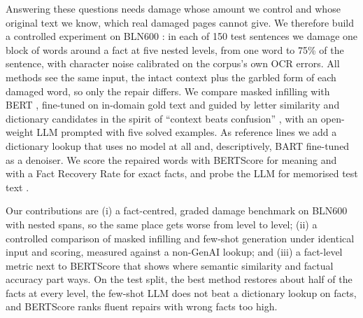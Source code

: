 Answering these questions needs damage whose amount we control and whose original text we know, which real damaged
pages cannot give. We therefore build a controlled experiment on BLN600 \citep{booth-etal-2024-bln600}: in each of
150 test sentences we damage one block of words around a fact at five nested levels, from one word to 75\% of the
sentence, with character noise calibrated on the corpus's own OCR errors. All methods see the same input, the
intact context plus the garbled form of each damaged word, so only the repair differs. We compare masked infilling
with BERT \citep{devlin2019bert}, fine-tuned on in-domain gold text and guided by letter similarity and dictionary
candidates in the spirit of ``context beats confusion'' \citep{evershed2014correcting}, with an open-weight LLM
prompted with five solved examples. As reference lines we add a dictionary lookup that uses no model at all and,
descriptively, BART \citep{lewis2020bart} fine-tuned as a denoiser. We score the repaired words with BERTScore \citep{zhang2020bertscore} for meaning and with a Fact Recovery
Rate for exact facts, and probe the LLM for memorised test text \citep{sainz2023contamination}.

Our contributions are (i) a fact-centred, graded damage benchmark on BLN600 with nested spans, so the same place
gets worse from level to level; (ii) a controlled comparison of masked infilling and few-shot generation under
identical input and scoring, measured against a non-GenAI lookup; and (iii) a fact-level metric next to BERTScore that shows where semantic similarity and
factual accuracy part ways. On the test split, the best method restores about half of
the facts at every level, the few-shot LLM does not beat a dictionary lookup on facts, and BERTScore ranks fluent
repairs with wrong facts too high.

